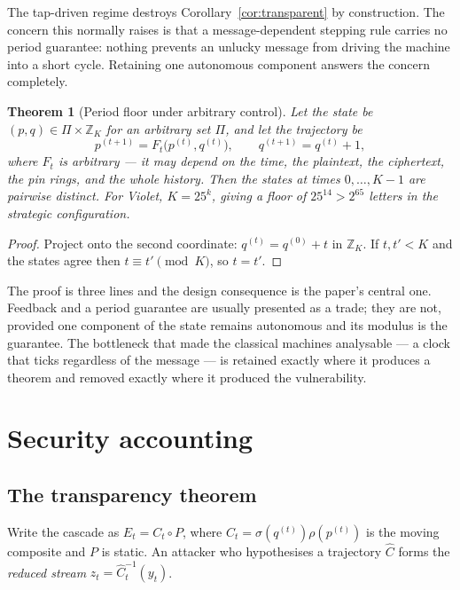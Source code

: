 \documentclass[11pt]{article}
\newtheorem{theorem}{Theorem}
\theoremstyle{definition}
\newcommand{\ZZ}{\mathbb{Z}}
\begin{document}
The tap-driven regime destroys Corollary~\ref{cor:transparent} by construction.
The concern this normally raises is that a message-dependent stepping rule
carries no period guarantee: nothing prevents an unlucky message from driving
the machine into a short cycle. Retaining one autonomous component answers the
concern completely.

\begin{theorem}[Period floor under arbitrary control]\label{thm:floor}
Let the state be $(p,q) \in \Pi \times \ZZ_{K}$ for an arbitrary set $\Pi$, and
let the trajectory be
\[
  p^{(t+1)} = F_t\bigl(p^{(t)}, q^{(t)}\bigr),\qquad q^{(t+1)} = q^{(t)} + 1,
\]
where $F_t$ is \emph{arbitrary} --- it may depend on the time, the plaintext, the
ciphertext, the pin rings, and the whole history. Then the states at times
$0,\dots,K-1$ are pairwise distinct. For Violet, $K = 25^{k}$, giving a floor of
$25^{14} > 2^{65}$ letters in the strategic configuration.
\end{theorem}

\begin{proof}
Project onto the second coordinate: $q^{(t)} = q^{(0)} + t$ in $\ZZ_K$. If
$t,t' < K$ and the states agree then $t \equiv t' \pmod K$, so $t = t'$.
\end{proof}

The proof is three lines and the design consequence is the paper's central one.
Feedback and a period guarantee are usually presented as a trade; they are not,
provided one component of the state remains autonomous and its modulus is the
guarantee. The bottleneck that made the classical machines analysable ---
a clock that ticks regardless of the message --- is retained exactly where it
produces a theorem and removed exactly where it produced the vulnerability.

\section{Security accounting}\label{sec:accounting}

\subsection{The transparency theorem}

Write the cascade as $E_t = C_t \circ P$, where $C_t = \sigma(q^{(t)})\rho(p^{(t)})$
is the moving composite and $P$ is static. An attacker who hypothesises a
trajectory $\widehat{C}$ forms the \emph{reduced stream}
$z_t = \widehat{C}_t^{-1}(y_t)$.
\end{document}
